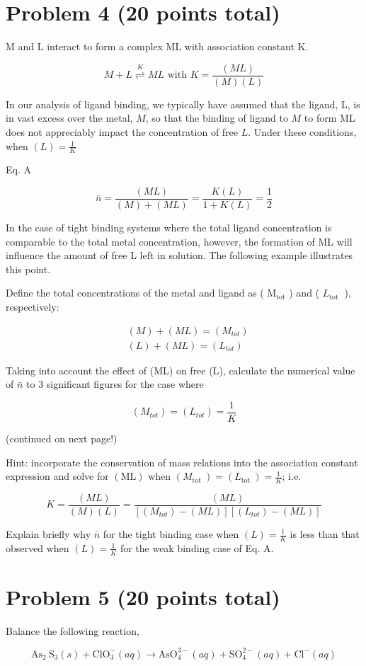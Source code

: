 \documentclass[12pt]{article}
\begin{document}
\section*{Problem 4 (20 points total)}
$\mathrm{M}$ and $\mathrm{L}$ interact to form a complex $\mathrm{ML}$ with association constant $\mathrm{K}$.

$$
M+L \stackrel{K}{\rightleftharpoons} M L \text { with } K=\frac{(M L)}{(M)(L)}
$$

In our analysis of ligand binding, we typically have assumed that the ligand, L, is in vast excess over the metal, $M$, so that the binding of ligand to $M$ to form ML does not appreciably impact the concentration of free $L$. Under these conditions, when $(L)=\frac{1}{K}$

Eq. A

$$
\bar{n}=\frac{(M L)}{(M)+(M L)}=\frac{K(L)}{1+K(L)}=\frac{1}{2}
$$

In the case of tight binding systems where the total ligand concentration is comparable to the total metal concentration, however, the formation of ML will influence the amount of free L left in solution. The following example illustrates this point.

Define the total concentrations of the metal and ligand as ( $\mathrm{M}_{\mathrm{tot}}$ ) and ( $L_{\text {tot }}$ ), respectively:

$$
\begin{aligned}
& (M)+(M L)=\left(M_{t o t}\right) \\
& (L)+(M L)=\left(L_{t o t}\right)
\end{aligned}
$$

Taking into account the effect of (ML) on free (L), calculate the numerical value of $\bar{n}$ to 3 significant figures for the case where

$$
\left(M_{t o t}\right)=\left(L_{t o t}\right)=\frac{1}{K}
$$

(continued on next page!)

Hint: incorporate the conservation of mass relations into the association constant expression and solve for $(\mathrm{ML})$ when $\left(M_{\text {tot }}\right)=\left(L_{\text {tot }}\right)=\frac{1}{K}$; i.e.

$$
K=\frac{(M L)}{(M)(L)}=\frac{(M L)}{\left[\left(M_{t o t}\right)-(M L)\right]\left[\left(L_{t o t}\right)-(M L)\right]}
$$

Explain briefly why $\bar{n}$ for the tight binding case when $(L)=\frac{1}{K}$ is less than that observed when $(L)=\frac{1}{K}$ for the weak binding case of Eq. A.

\section*{Problem 5 (20 points total)}
Balance the following reaction,

$$
\mathrm{As}_{2} \mathrm{~S}_{3}(s)+\mathrm{ClO}_{3}^{-}(a q) \rightarrow \mathrm{AsO}_{4}^{3-}(a q)+\mathrm{SO}_{4}^{2-}(a q)+\mathrm{Cl}^{-}(a q)
$$
\end{document}
